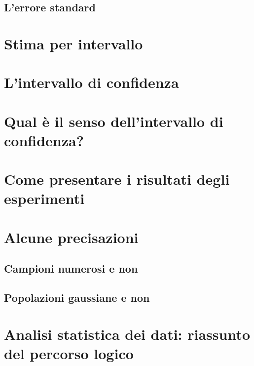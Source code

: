 \documentclass[a4paper,12pt,oneside]{book}
\begin{document}
\hypertarget{lerrore-standard}{%
\subsection{L'errore standard}\label{lerrore-standard}}

\hypertarget{stima-per-intervallo}{%
\section{Stima per intervallo}\label{stima-per-intervallo}}

\hypertarget{lintervallo-di-confidenza}{%
\section{L'intervallo di confidenza}\label{lintervallo-di-confidenza}}

\hypertarget{qual-uxe8-il-senso-dellintervallo-di-confidenza}{%
\section{Qual è il senso dell'intervallo di confidenza?}\label{qual-uxe8-il-senso-dellintervallo-di-confidenza}}

\hypertarget{come-presentare-i-risultati-degli-esperimenti}{%
\section{Come presentare i risultati degli esperimenti}\label{come-presentare-i-risultati-degli-esperimenti}}

\hypertarget{alcune-precisazioni}{%
\section{Alcune precisazioni}\label{alcune-precisazioni}}

\hypertarget{campioni-numerosi-e-non}{%
\subsection{Campioni numerosi e non}\label{campioni-numerosi-e-non}}

\hypertarget{popolazioni-gaussiane-e-non}{%
\subsection{Popolazioni gaussiane e non}\label{popolazioni-gaussiane-e-non}}

\hypertarget{analisi-statistica-dei-dati-riassunto-del-percorso-logico}{%
\section{Analisi statistica dei dati: riassunto del percorso logico}\label{analisi-statistica-dei-dati-riassunto-del-percorso-logico}}
\end{document}
